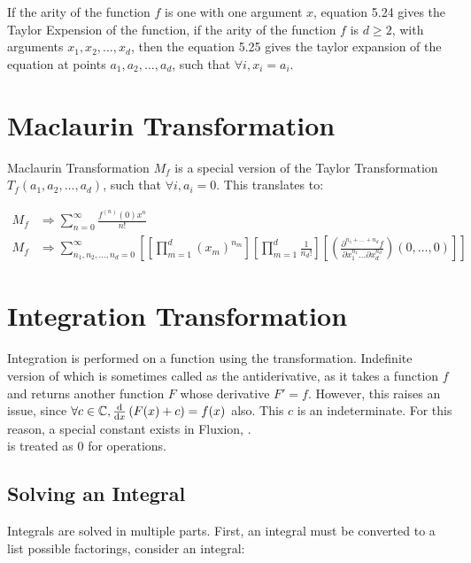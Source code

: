 \documentclass[11pt,a4paper]{book}
\begin{document}
If the arity of the function $f$ is one with one argument $x$, equation 5.24 gives the Taylor Expension of the function, if the arity of the function $f$ is $d \geq 2$, with arguments $x_1, x_2, \dots, x_d$, then the equation 5.25 gives the taylor expansion of the equation at points $a_1, a_2, \dots, a_d$, such that $\forall i, x_i = a_i$.

\section{Maclaurin Transformation}

Maclaurin Transformation $M_f$ is a special version of the Taylor Transformation $T_f(a_1, a_2, \dots, a_d)$, such that $\forall i, a_i = 0$. This translates to:

\begin{align}
M_f &\Rightarrow \sum_{n = 0}^{\infty} \frac{f^{(n)}(0)x^n}{n!} \\
M_f &\Rightarrow \sum_{n_1, n_2, \dots, n_d = 0}^{\infty} \left[ \left[ \prod_{m = 1}^d (x_m)^{n_m} \right] \left[ \prod_{m=1}^d \frac{1}{n_d!} \right] \left[\left( \frac{\partial^{n_1 + \dots + n_d} f}{\partial x_1^{n_1} \dots \partial x_d^{n_d}} \right)(0, \dots, 0) \right] \right]
\end{align}

\section{Integration Transformation}

Integration is performed on a function using the  transformation. Indefinite version of which is sometimes called as the antiderivative, as it takes a function $f$ and returns another function $F$ whose derivative $F' = f$. However, this raises an issue, since $\forall c \in \mathbb{C}, \frac{\text{d}}{\text{d}x} \left(F(x) + c\right) = f(x)$ also. This $c$ is an indeterminate. For this reason, a special constant exists in Fluxion, .\\

 is treated as 0 for operations. \\

\subsection{Solving an Integral}

Integrals are solved in multiple parts. First, an integral must be converted to a list possible factorings, consider an integral:
\end{document}
